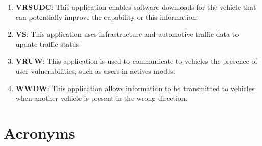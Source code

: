 \begin{enumerate}
\item \textbf{\acrfull{VRSUDC}}: This application enables software downloads for the vehicle that can potentially improve the capability or this information. \cite{etsi_etsi_tr_102_638_intelligent_2009}
\item \textbf{\acrfull{VS}}: This application uses infrastructure and automotive traffic data to update traffic status \cite{etsi_etsi_tr_102_638_intelligent_2009,boban_use_2017,raza_social_2018}
\item \textbf{\acrfull{VRUW}}: This application is used to communicate to vehicles the presence of user vulnerabilities, such as users in actives modes. \cite{etsi_etsi_tr_102_638_intelligent_2009,anaya_vulnerable_2015,raza_social_2018,al-sultan_comprehensive_2014,sewalkar_vehicle--pedestrian_2019,bila_vehicles_2017,noauthor_5g_2015,noauthor_intelligent_nodate,zeng_potential_2012,boban_use_2017}
\item \textbf{\acrfull{WWDW}}: This application allows information to be transmitted to vehicles when another vehicle is present in the wrong direction. \cite{etsi_etsi_tr_102_638_intelligent_2009,karagiannis_vehicular_2011,zeng_potential_2012,vogel_cloud-based_2017}
\end{enumerate}


\section{Acronyms}
\printnoidxglossary[type=\acronymtype]








